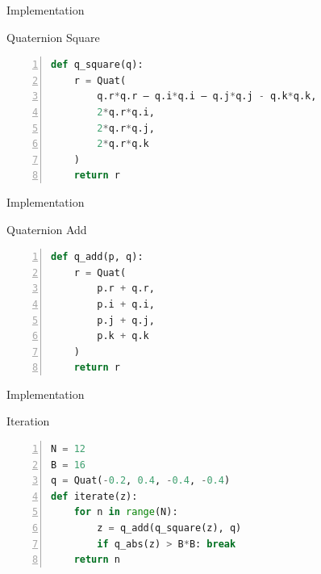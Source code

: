 \documentclass[aspectratio=169,t]{beamer}
\begin{document}
\begin{frame}[label={sec:org8cb605a},fragile]{Implementation}
 \begin{block}{Quaternion Square}
\begin{lstlisting}[language=Python,firstnumber=1,numbers=left]
def q_square(q):
    r = Quat(
        q.r*q.r – q.i*q.i – q.j*q.j - q.k*q.k,
        2*q.r*q.i,
        2*q.r*q.j,
        2*q.r*q.k
    )
    return r
\end{lstlisting}
\end{block}
\end{frame}

\begin{frame}[label={sec:org830b3dd},fragile]{Implementation}
 \begin{block}{Quaternion Add}
\begin{lstlisting}[language=Python,firstnumber=1,numbers=left]
def q_add(p, q):
    r = Quat(
        p.r + q.r,
        p.i + q.i,
        p.j + q.j,
        p.k + q.k
    )
    return r
\end{lstlisting}
\end{block}
\end{frame}

\begin{frame}[label={sec:org408fe8b},fragile]{Implementation}
 \begin{block}{Iteration}
\begin{lstlisting}[language=Python,firstnumber=1,numbers=left]
N = 12
B = 16
q = Quat(-0.2, 0.4, -0.4, -0.4)
def iterate(z):
    for n in range(N):
        z = q_add(q_square(z), q)
        if q_abs(z) > B*B: break
    return n
\end{lstlisting}
\end{block}
\end{frame}
\end{document}
